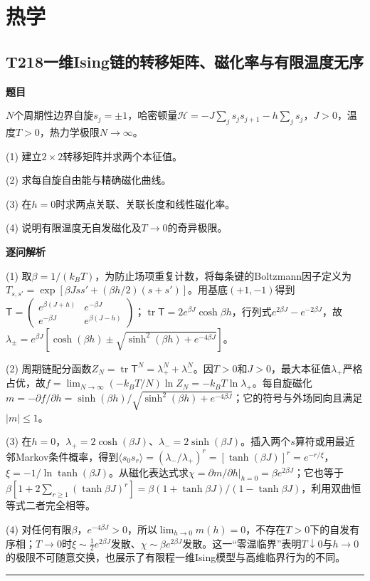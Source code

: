 \documentclass[UTF8,a4paper,11pt,oneside,openany]{ctexbook}
\begin{document}
\chapter{热学}
\section*{T218\quad 一维Ising链的转移矩阵、磁化率与有限温度无序}
\textbf{题目}\par
$N$个周期性边界自旋$s_j=\pm1$，哈密顿量$\mathcal H=-J\sum_js_js_{j+1}-h\sum_js_j$，$J>0$，温度$T>0$，热力学极限$N\to\infty$。
\par\smallskip\noindent (1) 建立$2\times2$转移矩阵并求两个本征值。
\par\smallskip\noindent (2) 求每自旋自由能与精确磁化曲线。
\par\smallskip\noindent (3) 在$h=0$时求两点关联、关联长度和线性磁化率。
\par\smallskip\noindent (4) 说明有限温度无自发磁化及$T\to0$的奇异极限。
\par\medskip\textbf{逐问解析}\par
\par\smallskip\noindent (1) 取$\beta=1/(k_BT)$，为防止场项重复计数，将每条键的Boltzmann因子定义为$T_{s,s'}=\exp[\beta Jss'+(\beta h/2)(s+s')]$。用基底$(+1,-1)$得到$\mathsf T=\begin{pmatrix}e^{\beta(J+h)}&e^{-\beta J}\\e^{-\beta J}&e^{\beta(J-h)}\end{pmatrix}$；$\operatorname{tr}\mathsf T=2e^{\beta J}\cosh\beta h$，行列式$e^{2\beta J}-e^{-2\beta J}$，故$\lambda_\pm=e^{\beta J}[\cosh(\beta h)\pm\sqrt{\sinh^2(\beta h)+e^{-4\beta J}}]$。
\par\smallskip\noindent (2) 周期链配分函数$Z_N=\operatorname{tr}\mathsf T^N=\lambda_+^N+\lambda_-^N$。因$T>0$和$J>0$，最大本征值$\lambda_+$严格占优，故$f=\lim_{N\to\infty}(-k_BT/N)\ln Z_N=-k_BT\ln\lambda_+$。每自旋磁化$m=-\partial f/\partial h=\sinh(\beta h)/\sqrt{\sinh^2(\beta h)+e^{-4\beta J}}$；它的符号与外场同向且满足$|m|\le1$。
\par\smallskip\noindent (3) 在$h=0$，$\lambda_+=2\cosh(\beta J)$、$\lambda_-=2\sinh(\beta J)$。插入两个$s$算符或用最近邻Markov条件概率，得到$\langle s_0s_r\rangle=(\lambda_-/\lambda_+)^r=[\tanh(\beta J)]^r=e^{-r/\xi}$，$\xi=-1/\ln\tanh(\beta J)$。从磁化表达式求$\chi=\partial m/\partial h|_{h=0}=\beta e^{2\beta J}$；它也等于$\beta[1+2\sum_{r\ge1}(\tanh\beta J)^r]=\beta(1+\tanh\beta J)/(1-\tanh\beta J)$，利用双曲恒等式二者完全相等。
\par\smallskip\noindent (4) 对任何有限$\beta$，$e^{-4\beta J}>0$，所以$\lim_{h\to0}m(h)=0$，不存在$T>0$下的自发有序相；$T\to0$时$\xi\sim\tfrac12e^{2\beta J}$发散、$\chi\sim\beta e^{2\beta J}$发散。这一“零温临界”表明$T\downarrow0$与$h\to0$的极限不可随意交换，也展示了有限程一维Ising模型与高维临界行为的不同。
\par\medskip\hrule\medskip
\end{document}
